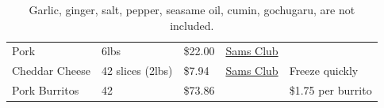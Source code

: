 \begin{definition}
\begin{table}[H]
\begin{tabular}{|l|l|l|l|l|}
      Pork & 6lbs & \$22.00 & \href{https://www.samsclub.com/ip/Member-s-Mark-Bone-In-Pork-Shoulder-Blade-Steaks-Tray-priced-per-pound/15573509823?athcpid=15573509823&athpgid=MyItemsPage&athcgid=null&athznid=MyItems&athieid=v0&athstid=CS020&athguid=fqaS_er5s38rHeWkdQc90d5khLnyTackqR0p&athancid=null&athena=true}{Sams Club} & \\
      Cheddar Cheese & 42 slices (2lbs) & \$7.94 & \href{https://www.samsclub.com/ip/Member-s-Mark-Sliced-Sharp-Cheddar-Cheese-2-lbs/13612912661?athcpid=13612912661&athpgid=MyItemsPage&athcgid=null&athznid=MyItems&athieid=v0&athstid=CS020&athguid=69RMVpmE-l46-lSvIvT3EAfvIl4kCnT9QU7p&athancid=null&athena=true}{Sams Club} & Freeze quickly \\
      \hline 
      Pork Burritos & 42 & \$73.86 & & \$1.75 per burrito \\ 
      \hline
    \end{tabular}
    \caption{Garlic, ginger, salt, pepper, seasame oil, cumin, gochugaru, are not included.}
    \label{tab:pork_burritos}
  \end{table}
\end{definition} 

